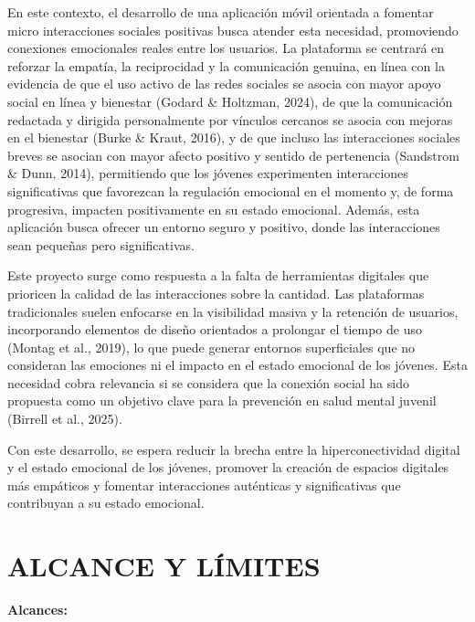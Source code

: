 En este contexto, el desarrollo de una aplicación móvil orientada a fomentar micro interacciones sociales positivas busca atender esta necesidad, promoviendo conexiones emocionales reales entre los usuarios. La plataforma se centrará en reforzar la empatía, la reciprocidad y la comunicación genuina, en línea con la evidencia de que el uso activo de las redes sociales se asocia con mayor apoyo social en línea y bienestar (Godard \& Holtzman, 2024), de que la comunicación redactada y dirigida personalmente por vínculos cercanos se asocia con mejoras en el bienestar (Burke \& Kraut, 2016), y de que incluso las interacciones sociales breves se asocian con mayor afecto positivo y sentido de pertenencia (Sandstrom \& Dunn, 2014), permitiendo que los jóvenes experimenten interacciones significativas que favorezcan la regulación emocional en el momento y, de forma progresiva, impacten positivamente en su estado emocional. Además, esta aplicación busca ofrecer un entorno seguro y positivo, donde las interacciones sean pequeñas pero significativas.

Este proyecto surge como respuesta a la falta de herramientas digitales que prioricen la calidad de las interacciones sobre la cantidad. Las plataformas tradicionales suelen enfocarse en la visibilidad masiva y la retención de usuarios, incorporando elementos de diseño orientados a prolongar el tiempo de uso (Montag et al., 2019), lo que puede generar entornos superficiales que no consideran las emociones ni el impacto en el estado emocional de los jóvenes. Esta necesidad cobra relevancia si se considera que la conexión social ha sido propuesta como un objetivo clave para la prevención en salud mental juvenil (Birrell et al., 2025).

Con este desarrollo, se espera reducir la brecha entre la hiperconectividad digital y el estado emocional de los jóvenes, promover la creación de espacios digitales más empáticos y fomentar interacciones auténticas y significativas que contribuyan a su estado emocional.

\section{ALCANCE Y LÍMITES}

\noindent\textbf{Alcances:}

